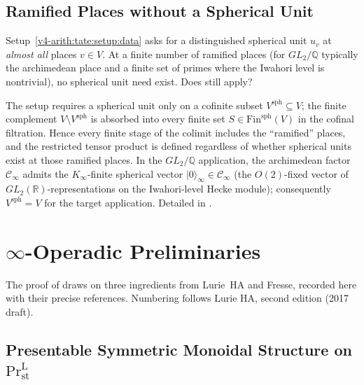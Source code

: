 \subsection{Ramified Places without a Spherical Unit}

\begin{obstruction}
Setup~\ref{v4-arith:tate:setup:data} asks for a distinguished
spherical unit \(u_{v}\) at \emph{almost all} places \(v\in V\). At a
finite number of ramified places (for \(GL_{2}/\mathbb{Q}\) typically
the archimedean place and a finite set of primes where the Iwahori
level is nontrivial), no spherical unit need exist. Does
 still apply?
\end{obstruction}

\begin{correction}
The setup requires a spherical unit only on a cofinite subset
\(V^{\mathrm{sph}}\subseteq V\); the finite complement \(V\setminus V^{\mathrm{sph}}\)
is absorbed into every finite set \(S\in\mathrm{Fin}^{\mathrm{sph}}(V)\)
in the cofinal filtration. Hence every finite stage of the colimit
includes the ``ramified'' places, and the restricted tensor product
is defined regardless of whether spherical units exist at those
ramified places. In the \(GL_{2}/\mathbb{Q}\) application, the
archimedean factor \(\mathcal{C}_{\infty}\) admits the \(K_{\infty}\)-finite
spherical vector \(|0\rangle_{\infty}\in\mathcal{C}_{\infty}\) (the
\(O(2)\)-fixed vector of \(GL_{2}(\mathbb{R})\)-representations on the
Iwahori-level Hecke module); consequently \(V^{\mathrm{sph}}=V\) for
the target application. Detailed in
.
\end{correction}

\section{\(\infty\)-Operadic Preliminaries}
\label{v4-arith:tate:operadic-prelim}

The proof of  draws on three
ingredients from Lurie~HA and Fresse, recorded here with their
precise references. Numbering follows Lurie HA, second edition (2017
draft).

\subsection{Presentable Symmetric Monoidal Structure on \(\mathrm{Pr}^{\mathrm{L}}_{\mathrm{st}}\)}
\label{v4-arith:tate:prelim-prl}

